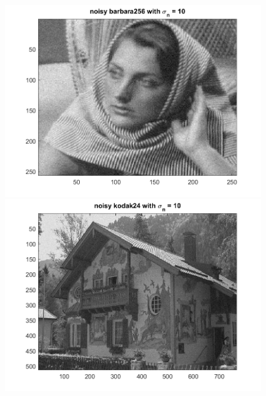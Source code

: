 \documentclass{article}
\begin{document}
\begin{figure}[!htb]
    \centering
    \begin{minipage}[b]{0.45\textwidth}
        \includegraphics[width=\textwidth]{barbara256_noise10.png}
    \end{minipage}
    \begin{minipage}[b]{0.45\textwidth}
        \includegraphics[width=\textwidth]{kodak24_noise10.png}
    \end{minipage}
\end{figure}
\end{document}
